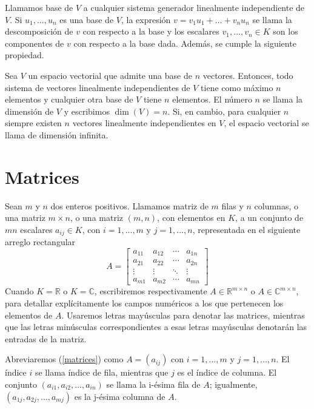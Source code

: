 Llamamos base de $V$ a cualquier sistema generador linealmente independiente de $V$. Si ${u_1, ..., u_n}$ es una base de $V$, la expresi\'on $v = v_1 u_1 + ... + v_n u_n$ se llama la descomposici\'on de $v$ con respecto a la base y los escalares $v_1, ..., v_n \in K$ son los componentes de $v$ con respecto a la base dada. Adem\'as, se cumple la siguiente propiedad.

\begin{property}
    Sea $V$ un espacio vectorial que admite una base de $n$ vectores. Entonces, todo sistema de vectores linealmente independientes de $V$ tiene como m\'aximo $n$ elementos y cualquier otra base de $V$ tiene $n$ elementos. El n\'umero $n$ se llama la dimensi\'on de $V$ y escribimos $\dim(V) = n$.
    Si, en cambio, para cualquier $n$ siempre existen $n$ vectores linealmente independientes en $V$, el espacio vectorial se llama de dimensi\'on infinita.
\end{property}

\section{Matrices}
Sean $m$ y $n$ dos enteros positivos. Llamamos matriz de $m$ filas y $n$ columnas, o una matriz $m \times n$, o una matriz $(m, n)$, con elementos en $K$, a un conjunto de $mn$ escalares $a_{ij} \in K$, con $i = 1,...,m$ y $j = 1,...,n$, representada en el siguiente arreglo rectangular
\begin{equation}
    A = \begin{bmatrix}
        a_{11} & a_{12} & \cdots & a_{1n} \\
        a_{21} & a_{22} & \cdots & a_{2n} \\
        \vdots & \vdots & \ddots & \vdots \\
        a_{m1} & a_{m2} & \cdots & a_{mn}
        \end{bmatrix}
    \label{matrices}
\end{equation}
Cuando $K = \mathbb{R}$ o $K = \mathbb{C}$, escribiremos respectivamente $A \in \mathbb{R}^{m \times n}$ o $A \in \mathbb{C}^{m \times n}$, para detallar explícitamente los campos numéricos a los que pertenecen los elementos de $A$. Usaremos letras mayúsculas para denotar las matrices, mientras que las letras minúsculas correspondientes a esas letras mayúsculas denotarán las entradas de la matriz.

Abreviaremos (\ref{matrices}) como $A = (a_{ij})$ con $i = 1,...,m$ y $j = 1,...,n$. El índice $i$ se llama índice de fila, mientras que $j$ es el índice de columna. El conjunto $(a_{i1}, a_{i2}, ..., a_{in})$ se llama la i-ésima fila de $A$; igualmente, $(a_{1j}, a_{2j}, ..., a_{mj})$ es la j-ésima columna de $A$.

